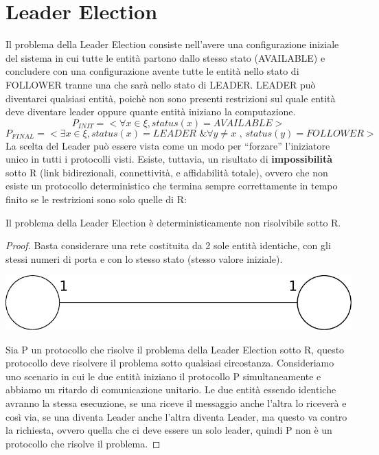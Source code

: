 \chapter{Leader Election}

Il problema della Leader Election consiste nell'avere una configurazione
iniziale del sistema in cui tutte le entità partono dallo stesso stato
(AVAILABLE) e concludere con una configurazione avente tutte le entità nello
stato di FOLLOWER tranne una che sarà nello stato di LEADER.
LEADER può diventarci qualsiasi entità, poichè non sono presenti restrizioni sul
quale entità deve diventare leader oppure quante entità iniziano la
computazione.
$$P_{INIT}=< \forall x \in \xi, status(x)=AVAILABLE >$$
$$P_{FINAL}=< \exists x \in \xi, status(x)=LEADER \text{ \& } \forall y \neq x
    \text{ , } status(y)=FOLLOWER >$$ La scelta del Leader può essere vista come un
modo per ``forzare'' l'iniziatore unico in tutti i protocolli visti. Esiste,
tuttavia, un risultato di \textbf{impossibilità} sotto R (link bidirezionali,
connettività, e affidabilità totale), ovvero che non esiste un protocollo
deterministico che termina sempre correttamente in tempo finito se le
restrizioni sono solo quelle di R:

\begin{theorem}
    Il problema della Leader Election è deterministicamente non
    risolvibile sotto R.
\end{theorem}

\begin{proof}
    Basta considerare una rete costituita da 2 sole entità identiche, con gli
    stessi numeri di porta e con lo stesso stato (stesso valore iniziale).

    \begin{center}
        \includegraphics[scale=0.3]{images/n_42}
    \end{center}
    Sia P un protocollo che risolve il problema della Leader Election sotto R,
    questo protocollo deve risolvere il problema sotto qualsiasi circostanza.
    Consideriamo uno scenario in cui le due entità iniziano il protocollo P
    simultaneamente e abbiamo un ritardo di comunicazione unitario. Le due
    entità essendo identiche avranno la stessa esecuzione, se una riceve il
    messaggio anche l'altra lo riceverà e così via, se una diventa Leader anche
    l'altra diventa Leader, ma questo va contro la richiesta, ovvero quella che
    ci deve essere un solo leader, quindi P non è un protocollo che risolve il
    problema.
\end{proof}

